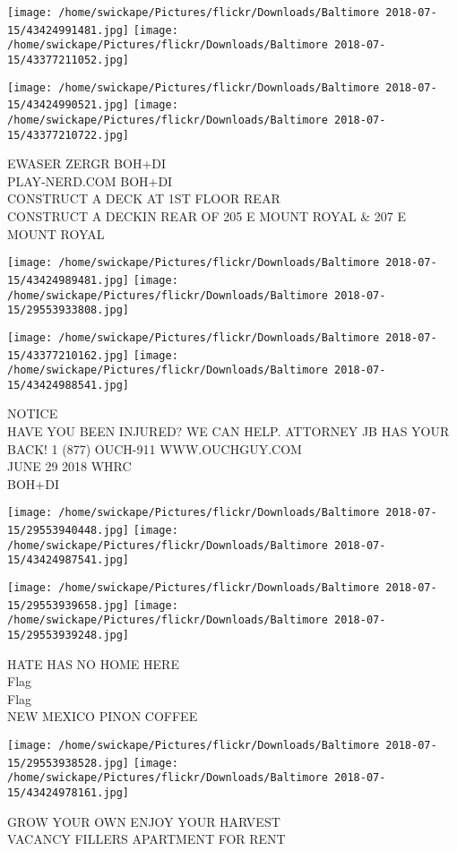 \documentclass[10pt,letterpaper]{article}
\begin{document}
\texttt{[image: /home/swickape/Pictures/flickr/Downloads/Baltimore 2018-07-15/43424991481.jpg]}
\texttt{[image: /home/swickape/Pictures/flickr/Downloads/Baltimore 2018-07-15/43377211052.jpg]}

\texttt{[image: /home/swickape/Pictures/flickr/Downloads/Baltimore 2018-07-15/43424990521.jpg]}
\texttt{[image: /home/swickape/Pictures/flickr/Downloads/Baltimore 2018-07-15/43377210722.jpg]}

EWASER ZERGR BOH+DI\\
PLAY{-}NERD.COM BOH+DI\\
CONSTRUCT A DECK AT 1ST FLOOR REAR\\
CONSTRUCT A DECKIN REAR OF 205 E MOUNT ROYAL \& 207 E MOUNT ROYAL
\pagebreak

\texttt{[image: /home/swickape/Pictures/flickr/Downloads/Baltimore 2018-07-15/43424989481.jpg]}
\texttt{[image: /home/swickape/Pictures/flickr/Downloads/Baltimore 2018-07-15/29553933808.jpg]}

\texttt{[image: /home/swickape/Pictures/flickr/Downloads/Baltimore 2018-07-15/43377210162.jpg]}
\texttt{[image: /home/swickape/Pictures/flickr/Downloads/Baltimore 2018-07-15/43424988541.jpg]}

NOTICE\\
HAVE YOU BEEN INJURED?  WE CAN HELP.  ATTORNEY JB HAS YOUR BACK!  1 (877) OUCH{-}911 WWW.OUCHGUY.COM\\
JUNE 29 2018 WHRC\\
BOH+DI
\pagebreak

\texttt{[image: /home/swickape/Pictures/flickr/Downloads/Baltimore 2018-07-15/29553940448.jpg]}
\texttt{[image: /home/swickape/Pictures/flickr/Downloads/Baltimore 2018-07-15/43424987541.jpg]}

\texttt{[image: /home/swickape/Pictures/flickr/Downloads/Baltimore 2018-07-15/29553939658.jpg]}
\texttt{[image: /home/swickape/Pictures/flickr/Downloads/Baltimore 2018-07-15/29553939248.jpg]}

HATE HAS NO HOME HERE\\
Flag\\
Flag\\
NEW MEXICO PINON COFFEE
\pagebreak

\texttt{[image: /home/swickape/Pictures/flickr/Downloads/Baltimore 2018-07-15/29553938528.jpg]}
\texttt{[image: /home/swickape/Pictures/flickr/Downloads/Baltimore 2018-07-15/43424978161.jpg]}

GROW YOUR OWN ENJOY YOUR HARVEST\\
VACANCY FILLERS APARTMENT FOR RENT
\pagebreak
\end{document}
